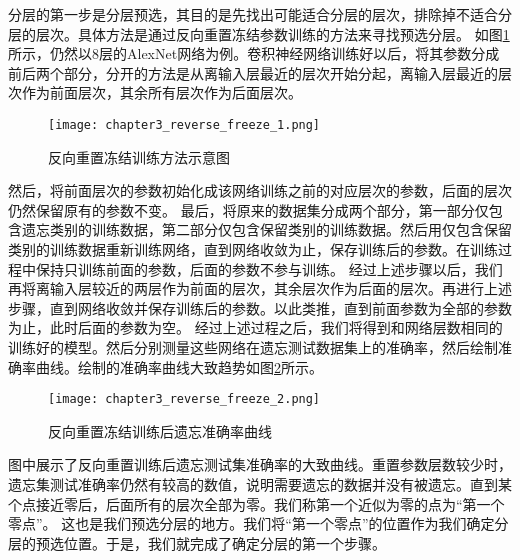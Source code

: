 分层的第一步是分层预选，其目的是先找出可能适合分层的层次，排除掉不适合分层的层次。具体方法是通过反向重置冻结参数训练的方法来寻找预选分层。
如图\ref{fig:chapter3_reverse_freeze_1}所示，仍然以8层的AlexNet网络为例。卷积神经网络训练好以后，将其参数分成前后两个部分，分开的方法是从离输入层最近的层次开始分起，离输入层最近的层次作为前面层次，其余所有层次作为后面层次。
\begin{figure}
    \centering
    \texttt{[image: chapter3\_reverse\_freeze\_1.png]}
    \caption{反向重置冻结训练方法示意图}
    \label{fig:chapter3_reverse_freeze_1}
\end{figure}
然后，将前面层次的参数初始化成该网络训练之前的对应层次的参数，后面的层次仍然保留原有的参数不变。
最后，将原来的数据集分成两个部分，第一部分仅包含遗忘类别的训练数据，第二部分仅包含保留类别的训练数据。然后用仅包含保留类别的训练数据重新训练网络，直到网络收敛为止，保存训练后的参数。在训练过程中保持只训练前面的参数，后面的参数不参与训练。
经过上述步骤以后，我们再将离输入层较近的两层作为前面的层次，其余层次作为后面的层次。再进行上述步骤，直到网络收敛并保存训练后的参数。以此类推，直到前面参数为全部的参数为止，此时后面的参数为空。
经过上述过程之后，我们将得到和网络层数相同的训练好的模型。然后分别测量这些网络在遗忘测试数据集上的准确率，然后绘制准确率曲线。绘制的准确率曲线大致趋势如图\ref{fig:chapter3_reverse_freeze_2}所示。
\begin{figure}
    \centering
    \texttt{[image: chapter3\_reverse\_freeze\_2.png]}
    \caption{反向重置冻结训练后遗忘准确率曲线}
    \label{fig:chapter3_reverse_freeze_2}
\end{figure}
图中展示了反向重置训练后遗忘测试集准确率的大致曲线。重置参数层数较少时，遗忘集测试准确率仍然有较高的数值，说明需要遗忘的数据并没有被遗忘。直到某个点接近零后，后面所有的层次全部为零。我们称第一个近似为零的点为“第一个零点”。
这也是我们预选分层的地方。我们将“第一个零点”的位置作为我们确定分层的预选位置。于是，我们就完成了确定分层的第一个步骤。

